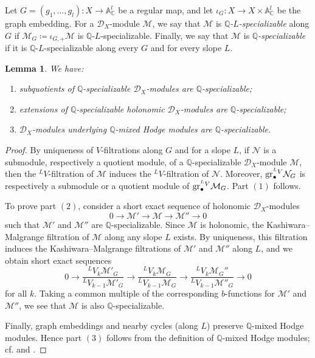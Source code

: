 \documentclass{amsart}
\theoremstyle{plain}
\numberwithin{theorem}{section}
\newtheorem{lemma}[theorem]{Lemma}
\theoremstyle{definition}
\theoremstyle{remark}
\theoremstyle{definition}
\newcommand{\A}{\mathbb{A}}
\newcommand{\C}{\mathbb{C}} %
\newcommand{\Q}{\mathbb{Q}}
\newcommand{\cM}{\mathcal{M}}
\newcommand{\cN}{\mathcal{N}}
\newcommand{\gr}{\textup{gr}}
\newcommand{\shD}{\mathscr{D}}
\begin{document}
Let
$G=(g_1,\dots,g_l)\colon X\rightarrow \A_\C^l$
be a regular map, and let
$\iota_G\colon X\to X\times \A_\C^l$
be the graph embedding. For a $\shD_X$-module $\cM$, we say that $\cM$ is
\emph{$\Q$-$L$-specializable} along $G$ if
$\cM_G\coloneqq \iota_{G,+}\cM$
is $\Q$-$L$-specializable. Finally, we say that $\cM$ is
\emph{$\Q$-specializable} if it is $\Q$-$L$-specializable along every $G$ and
for every slope $L$.

\begin{lemma}\label{lm:sqstQsp}
We have:
\begin{enumerate}[label=$(\arabic*)$]
    \item subquotients of $\Q$-specializable $\shD_X$-modules are
    $\Q$-specializable;
    \item extensions of $\Q$-specializable holonomic $\shD_X$-modules are
    $\Q$-specializable;
    \item $\shD_X$-modules underlying $\Q$-mixed Hodge modules are
    $\Q$-specializable.
\end{enumerate}
\end{lemma}

\begin{proof}
By uniqueness of $V$-filtrations along $G$ and for a slope $L$, if $\cN$ is a submodule, respectively a
quotient module, of a $\Q$-specializable $\shD_X$-module $\cM$, then the
${}^LV$-filtration of $\cM$ induces the ${}^LV$-filtration of $\cN$. Moreover,
$\gr^{{}^LV}_\bullet\cN_G$ is respectively a submodule or a quotient module of
$\gr^{{}^LV}_\bullet\cM_G$. Part $(1)$ follows.

To prove part $(2)$, consider a short exact sequence of holonomic
$\shD_X$-modules
\[
0\to \cM'\to \cM\to \cM''\to 0
\]
such that $\cM'$ and $\cM''$ are $\Q$-specializable. Since $\cM$ is
holonomic, the Kashiwara--Malgrange filtration of $\cM$ along any slope $L$
exists. By uniqueness, this filtration induces the Kashiwara--Malgrange
filtrations of $\cM'$ and $\cM''$ along $L$, and we obtain short exact sequences
\[
0\to
\frac{{}^L V_k\cM'_G}{{}^L V_{k-1}\cM'_G}
\to
\frac{{}^L V_k\cM_G}{{}^L V_{k-1}\cM_G}
\to
\frac{{}^L V_k\cM_G''}{{}^L V_{k-1}\cM''_G}
\to 0
\]
for all $k$. Taking a common multiple of the corresponding $b$-functions for
$\cM'$ and $\cM''$, we see that $\cM$ is also $\Q$-specializable.

Finally, graph embeddings and nearby cycles (along $L$) preserve $\Q$-mixed Hodge
modules. Hence part $(3)$ follows from the definition of $\Q$-mixed Hodge
modules; cf. \cite{MHM90} and \cite[Lem.4.16]{Wuch}.
\end{proof}
\end{document}
